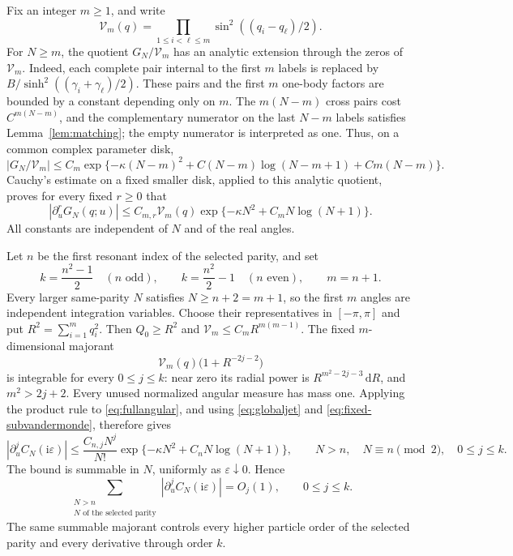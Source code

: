 \documentclass[11pt]{article}
\numberwithin{equation}{section}
\theoremstyle{definition}
\newcommand{\dd}{\,\mathrm d}
\newcommand{\ii}{\mathrm i}
\newcommand{\eps}{\varepsilon}
\begin{document}
Fix an integer $m\ge1$, and write
\[
 \mathcal V_m(q)=\prod_{1\le i<\ell\le m}
                   \sin^2((q_i-q_\ell)/2).
\]
For $N\ge m$, the quotient $G_N/\mathcal V_m$ has an analytic
extension through the zeros of $\mathcal V_m$. Indeed, each complete
pair internal to the first $m$ labels is replaced by
$B/\sinh^2((\gamma_i+\gamma_\ell)/2)$. These pairs and the first
$m$ one-body factors are bounded by a constant depending only on $m$.
The $m(N-m)$ cross pairs cost $C^{m(N-m)}$, and the complementary
numerator on the last $N-m$ labels satisfies
Lemma~\ref{lem:matching}; the empty numerator is interpreted as one.
Thus, on a common complex parameter disk,
\[
 \left|G_N/\mathcal V_m\right|
 \le C_m\exp\{-\kappa(N-m)^2
          +C(N-m)\log(N-m+1)+Cm(N-m)\}.
\]
Cauchy's estimate on a fixed smaller disk, applied to this analytic
quotient, proves for every fixed $r\ge0$ that
\begin{equation}\label{eq:fixed-subvandermonde}
 |\partial_u^rG_N(q;u)|
 \le C_{m,r}\mathcal V_m(q)
       \exp\{-\kappa N^2+C_mN\log(N+1)\}.
\end{equation}
All constants are independent of $N$ and of the real angles.

Let $n$ be the first resonant index of the selected parity, and set
\[
 k=\frac{n^2-1}{2}\quad(n\text{ odd}),\qquad
 k=\frac{n^2}{2}-1\quad(n\text{ even}),\qquad m=n+1.
\]
Every larger same-parity $N$ satisfies $N\ge n+2=m+1$, so the first
$m$ angles are independent integration variables. Choose their
representatives in $[-\pi,\pi]$ and put $R^2=\sum_{i=1}^m q_i^2$.
Then $Q_0\ge R^2$ and
$\mathcal V_m\le C_mR^{m(m-1)}$. The fixed $m$-dimensional
majorant
\[
 \mathcal V_m(q)\bigl(1+R^{-2j-2}\bigr)
\]
is integrable for every $0\le j\le k$: near zero its radial power is
$R^{m^2-2j-3}\dd R$, and $m^2>2j+2$. Every unused normalized
angular measure has mass one. Applying the product rule to
\eqref{eq:fullangular}, and using \eqref{eq:globaljet} and
\eqref{eq:fixed-subvandermonde}, therefore gives
\begin{equation}\label{eq:hightail}
 |\partial_u^jC_N(\ii\eps)|
 \le\frac{C_{n,j}N^j}{N!}
      \exp\{-\kappa N^2+C_nN\log(N+1)\},
 \qquad N>n,\quad N\equiv n\pmod2,
 \quad0\le j\le k.
\end{equation}
The bound is summable in $N$, uniformly as $\eps\downarrow0$. Hence
\begin{equation}\label{eq:alltail}
 \sum_{\substack{N>n\\N\text{ of the selected parity}}}
 |\partial_u^jC_N(\ii\eps)|=O_j(1),\qquad0\le j\le k.
\end{equation}
The same summable majorant controls every higher particle order
of the selected parity and every derivative through order $k$.
\end{document}
